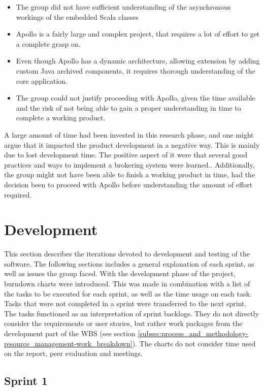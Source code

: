 \begin{itemize}
\item The group did not have sufficient understanding of the asynchronous workings of the embedded Scala classes
\item Apollo is a fairly large and complex project, that requires a lot of effort to get a complete grasp on.
\item Even though Apollo has a dynamic architecture, allowing extension by adding custom Java archived components, it requires thorough understanding of the core application.
\item The group could not justify proceeding with Apollo, given the time available and the risk of not being able to gain a proper understanding in time to complete a working product.
\end{itemize}

A large amount of time had been invested in this research phase, and one might argue that it impacted the product development in a negative way. This is mainly due to lost development time. The positive aspect of it were that several good practices and ways to implement a brokering system were learned.. Additionally, the group might not have been able to finish a working product in time, had the decision been to proceed with Apollo before understanding the amount of effort required.

\section{Development}
\label{subsec:project_lifecycle-development}

This section describes the iterations devoted to development and testing of the software. The following sections includes a general explanation of each sprint, as well as issues the group faced. With the development phase of the project, burndown charts were introduced. This was made in combination with a list of the tasks to be executed for each sprint, as well as the time usage on each task. Tasks that were not completed in a sprint were transferred to the next sprint. The tasks functioned as an interpretation of sprint backlogs. They do not directly consider the requirements or user stories, but rather work packages from the development part of the WBS (see section \ref{subsec:process_and_methodology-resource_management-work_breakdown}).  The charts do not consider time used on the report, peer evaluation and meetings.

\subsection{Sprint 1}
\label{subsec:project_lifecycle-development-sprint_1}

